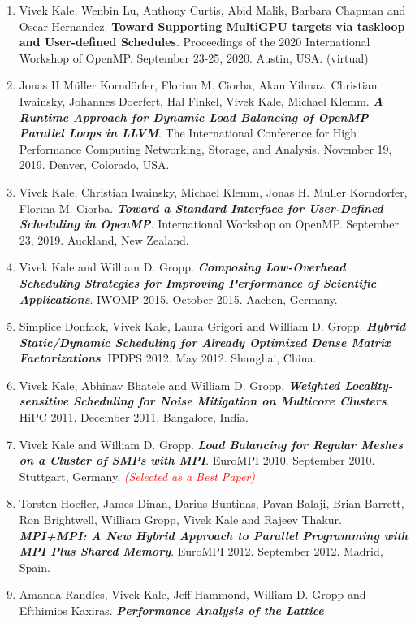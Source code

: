 \begin{enumerate}
\item Vivek Kale, Wenbin Lu, Anthony Curtis, Abid Malik, Barbara Chapman and Oscar Hernandez. \textbf{\textbf{Toward Supporting MultiGPU targets via taskloop and User-defined Schedules}}. Proceedings of the 2020 International Workshop of OpenMP. September 23-25, 2020. Austin, USA. (virtual) 

\item Jonas H Müller Korndörfer, Florina M. Ciorba, Akan Yilmaz, Christian Iwainsky, Johannes Doerfert, Hal Finkel, Vivek Kale, Michael Klemm. \textbf{\textit{A Runtime Approach for Dynamic Load Balancing of OpenMP Parallel Loops in LLVM}}. The International Conference for High Performance Computing Networking, Storage, and Analysis. November 19, 2019. Denver, Colorado, USA.

\item Vivek Kale, Christian Iwainsky, Michael Klemm, Jonas H. Muller Korndorfer, Florina M. Ciorba. \textbf{\textit{Toward a Standard Interface for User-Defined Scheduling in OpenMP}}. International Workshop on OpenMP. September 23, 2019. Auckland, New Zealand. 
\item Vivek Kale and William D. Gropp. \textbf{\textit{Composing Low-Overhead Scheduling Strategies for Improving Performance of Scientific Applications}}. IWOMP 2015. October 2015. Aachen, Germany.
\item Simplice Donfack, Vivek Kale, Laura Grigori and William D. Gropp. \textbf{\textit{Hybrid Static/Dynamic Scheduling for Already Optimized Dense Matrix Factorizations}}. IPDPS 2012. May 2012. Shanghai, China.
\item Vivek Kale, Abhinav Bhatele and William D. Gropp. \textbf{\textit{Weighted Locality-sensitive Scheduling for
      Noise Mitigation on Multicore Clusters}}. HiPC 2011. December
  2011. Bangalore, India. 
\item Vivek Kale and William D. Gropp. \textbf{\textit{Load Balancing for Regular Meshes on a Cluster of SMPs with MPI}}. EuroMPI 2010. September 2010. Stuttgart, Germany. \textit{\textcolor{red}{(Selected as a Best Paper)}}
\item Torsten Hoefler, James Dinan, Darius Buntinas, Pavan Balaji, Brian Barrett, Ron Brightwell, William Gropp, Vivek Kale and Rajeev Thakur. \textbf{\textit{MPI+MPI: A New Hybrid Approach to Parallel Programming with MPI Plus Shared Memory}}. EuroMPI 2012. September 2012. Madrid, Spain.
\item Amanda Randles, Vivek Kale, Jeff Hammond, William D. Gropp and Efthimios Kaxiras. \textbf{\textit{Performance Analysis of the Lattice
}}
\end{enumerate}

